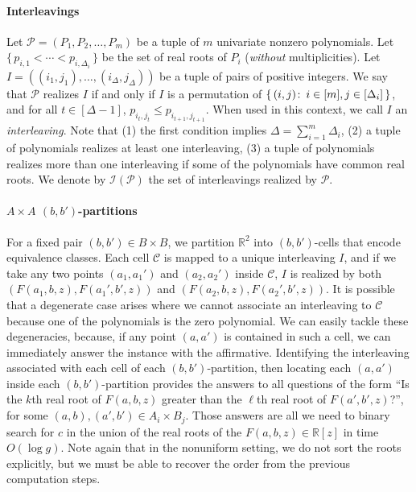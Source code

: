 \paragraph{Interleavings}
Let $\mathcal{P} = (P_1,P_2,\ldots,P_m)$ be a tuple of $m$ univariate nonzero
polynomials.
Let $\{\,p_{i,1} < \cdots < p_{i,\Delta_i}\,\}$
be the set of real roots of $P_i$ (\emph{without} multiplicities).
Let $I = ((i_1,j_1),\ldots,(i_{\Delta},j_\Delta))$
be a tuple of pairs of positive integers.
%
We say that $\mathcal{P}$ realizes $I$ if and only if
$I$ is a permutation of
$\{\,(i,j) \colon\, i \in [m], j \in [\Delta_i]\,\}$, and
for all $t \in [\Delta-1]$, $p_{i_t,j_t} \le p_{i_{t+1},j_{t+1}}$.
When used in this context, we call $I$ an \emph{interleaving}.
%
Note that (1) the first condition implies $\Delta=\sum_{i=1}^{m}\Delta_i$,
(2) a tuple of polynomials realizes at least one interleaving,
(3) a tuple of polynomials realizes more than one interleaving if some of the
polynomials have common real roots.
%
We denote by $\mathcal{I}(\mathcal{P})$ the set of interleavings realized by
$\mathcal{P}$.


\paragraph{$A \times A$ $(b,b')$-partitions}
For a fixed pair $(b,b') \in B\times B$, we partition $\mathbb{R}^2$ into
$(b,b')$-cells that encode equivalence classes. Each cell $\mathcal{C}$ is
mapped to a unique interleaving $I$, and if we take any two points $(a_1,a_1')$
and $(a_2,a_2')$ inside $\mathcal{C}$,
\(I\) is realized by
both $(F(a_1,b,z),F(a_1',b',z))$ and
$(F(a_2,b,z),F(a_2',b',z))$.
%
It is possible that a degenerate case arises where we cannot associate an
interleaving to \(\mathcal{C}\) because one of the polynomials is the zero
polynomial. We can easily tackle these degeneracies,
because, if any point \((a,a')\) is contained in such a cell,
we can immediately answer the instance with the affirmative.
%
Identifying the interleaving associated with each cell of each
$(b,b')$-partition, then locating each $(a,a')$ inside each $(b,b')$-partition
provides the answers to all questions of the form ``Is the $k$th real root of
$F(a,b,z)$ greater than the $\ell$th real root of $F(a',b',z)$?'', for some $(a,b),
(a',b')\in A_i\times B_j$. Those answers are all we need to binary
search for $c$ in the union of the real roots of the $F(a,b,z) \in
\mathbb{R}[z]$ in time $O(\log g)$. Note again that in the nonuniform setting,
we do not sort the roots explicitly, but we must be able to recover the order
from the previous computation steps.

